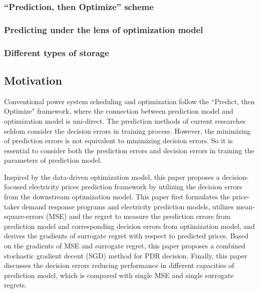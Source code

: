 \documentclass[journal]{IEEEtran}
\begin{document}
\subsubsection{``Prediction, then Optimize'' scheme}

\subsubsection{Predicting under the lens of optimization model}

\subsubsection{Different types of storage}

\subsection{Motivation}

Conventional power system scheduling and optimization follow the ``Predict, then Optimize" framework, where the connection between prediction model and optimization model is uni-direct. The prediction methods of current researches seldom consider the decision errors in training process. However, the minimizing of prediction errors is not equivalent to minimizing decision errors. So it is essential to consider both the prediction errors and decision errors in training the parameters of prediction model. 

Inspired by the data-driven optimization model, this paper proposes a decision-focused electricity prices prediction framework by utilizing the decision errors from the downstream optimization model. This paper first formulates the price-taker demand response programs and electricity prediction models, utilizes mean-square-errors (MSE) and the regret to measure the prediction errors from prediction model and corresponding decision errors from optimization model, and derives the gradients of surrogate regret with respect to predicted prices. Based on the gradients of MSE and surrogate regret, this paper proposes a combined stochastic gradient decent (SGD) method for PDR decision. Finally, this paper discusses the decision errors reducing performance in different capacities of prediction model, which is compared with single MSE and single surrogate regrets. 
\end{document}
